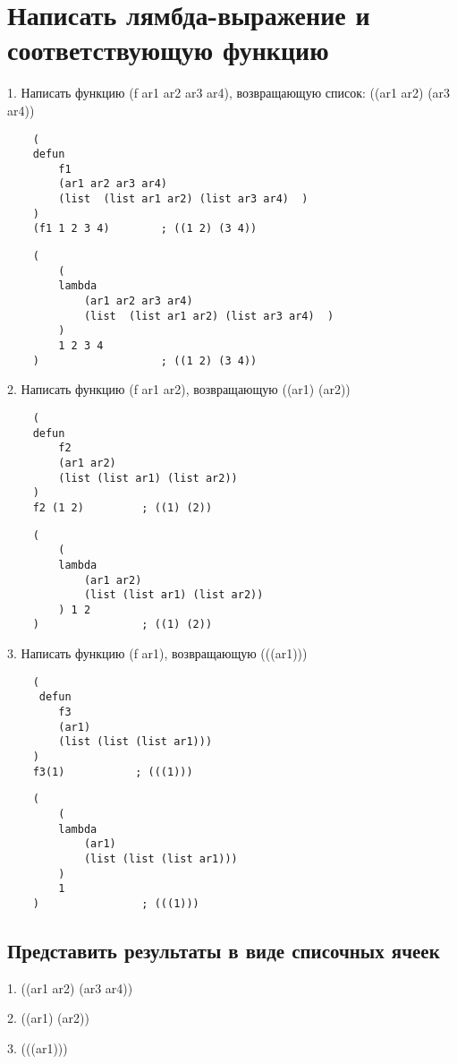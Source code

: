 \section{Написать лямбда-выражение и соответствующую функцию}

1. Написать функцию (f ar1 ar2 ar3 ar4), возвращающую список:
((ar1 ar2) (ar3 ar4))

\begin{lstlisting}
    (
    defun 
        f1 
        (ar1 ar2 ar3 ar4)
        (list  (list ar1 ar2) (list ar3 ar4)  )
    )
    (f1 1 2 3 4)        ; ((1 2) (3 4))
\end{lstlisting}

\begin{lstlisting}
    (
        (
        lambda 
            (ar1 ar2 ar3 ar4)
            (list  (list ar1 ar2) (list ar3 ar4)  )
        )
        1 2 3 4         
    )                   ; ((1 2) (3 4))
\end{lstlisting}

2. Написать функцию (f ar1 ar2), возвращающую ((ar1) (ar2))

\begin{lstlisting}
    (
    defun
        f2 
        (ar1 ar2)
        (list (list ar1) (list ar2))
    )
    f2 (1 2)         ; ((1) (2)) 
\end{lstlisting}

\begin{lstlisting}
    (
        (
        lambda 
            (ar1 ar2)
            (list (list ar1) (list ar2))  
        ) 1 2
    )                ; ((1) (2)) 
\end{lstlisting}


3. Написать функцию (f ar1), возвращающую (((ar1)))

\begin{lstlisting}
    (
     defun
        f3
        (ar1)
        (list (list (list ar1)))
    )
    f3(1)           ; (((1)))
\end{lstlisting}

\begin{lstlisting}
    (
        (
        lambda 
            (ar1)
            (list (list (list ar1)))
        )
        1 
    )                ; (((1)))
\end{lstlisting}

\subsection*{Представить результаты в виде списочных ячеек}

1. ((ar1 ar2) (ar3 ar4))

\newpage

2. ((ar1) (ar2))

3. (((ar1)))
